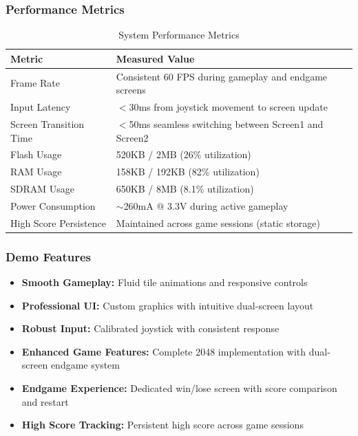 \documentclass[12pt,a4paper]{article}
\begin{document}
\subsubsection{Performance Metrics}

\begin{table}[H]
\centering
\caption{System Performance Metrics}
\label{tab:performance}
\begin{tabular}{|l|l|}
\hline
\textbf{Metric} & \textbf{Measured Value} \\
\hline
Frame Rate & Consistent 60 FPS during gameplay and endgame screens \\
\hline
Input Latency & $<$30ms from joystick movement to screen update \\
\hline
Screen Transition Time & $<$50ms seamless switching between Screen1 and Screen2 \\
\hline
Flash Usage & 520KB / 2MB (26\% utilization) \\
\hline
RAM Usage & 158KB / 192KB (82\% utilization) \\
\hline
SDRAM Usage & 650KB / 8MB (8.1\% utilization) \\
\hline
Power Consumption & $\sim$260mA @ 3.3V during active gameplay \\
\hline
High Score Persistence & Maintained across game sessions (static storage) \\
\hline
\end{tabular}
\end{table}

\subsubsection{Demo Features}
\begin{itemize}[leftmargin=*]
    \item \textbf{Smooth Gameplay:} Fluid tile animations and responsive controls
    \item \textbf{Professional UI:} Custom graphics with intuitive dual-screen layout
    \item \textbf{Robust Input:} Calibrated joystick with consistent response
    \item \textbf{Enhanced Game Features:} Complete 2048 implementation with dual-screen endgame system
    \item \textbf{Endgame Experience:} Dedicated win/lose screen with score comparison and restart
    \item \textbf{High Score Tracking:} Persistent high score across game sessions
\end{itemize}
\end{document}
